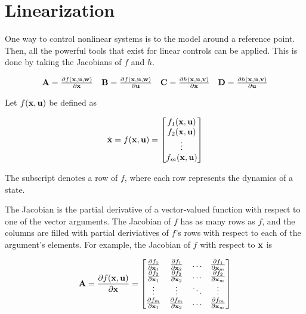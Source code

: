 \section{Linearization}

One way to control nonlinear \glspl{system} is to
 the \gls{model} around a reference point.
Then, all the powerful tools that exist for linear controls can be applied. This
is done by taking the Jacobians of $f$ and $h$.

\begin{align*}
  \begin{array}{cccc}
    \mathbf{A} = \frac{\partial f(\mathbf{x}, \mathbf{u}, \mathbf{w})}{\partial \mathbf{x}} &
    \mathbf{B} = \frac{\partial f(\mathbf{x}, \mathbf{u}, \mathbf{w})}{\partial \mathbf{u}} &
    \mathbf{C} = \frac{\partial h(\mathbf{x}, \mathbf{u}, \mathbf{v})}{\partial \mathbf{x}} &
    \mathbf{D} = \frac{\partial h(\mathbf{x}, \mathbf{u}, \mathbf{v})}{\partial \mathbf{u}}
  \end{array}
\end{align*}

Let $f(\mathbf{x}, \mathbf{u})$ be defined as

\begin{equation*}
  \dot{\mathbf{x}} = f(\mathbf{x}, \mathbf{u}) =
  \begin{bmatrix}
    f_1(\mathbf{x}, \mathbf{u}) \\
    f_2(\mathbf{x}, \mathbf{u}) \\
    \vdots \\
    f_m(\mathbf{x}, \mathbf{u})
  \end{bmatrix}
\end{equation*}

The subscript denotes a row of $f$, where each row represents the dynamics of a
state.

The Jacobian is the partial derivative of a vector-valued function with respect
to one of the vector arguments. The Jacobian of $f$ has as many rows as $f$, and
the columns are filled with partial deriviatives of $f$'s rows with respect to
each of the argument's elements. For example, the Jacobian of $f$ with respect
to $\mathbf{x}$ is

\begin{equation*}
  \mathbf{A} = \frac{\partial f(\mathbf{x}, \mathbf{u})}{\partial \mathbf{x}} =
  \begin{bmatrix}
    \frac{\partial f_1}{\partial \mathbf{x}_1} &
      \frac{\partial f_1}{\partial \mathbf{x}_2} & \hdots &
      \frac{\partial f_1}{\partial \mathbf{x}_m} \\
    \frac{\partial f_2}{\partial \mathbf{x}_1} &
      \frac{\partial f_2}{\partial \mathbf{x}_2} & \hdots &
      \frac{\partial f_2}{\partial \mathbf{x}_m} \\
    \vdots & \vdots & \ddots & \vdots \\
    \frac{\partial f_m}{\partial \mathbf{x}_1} &
      \frac{\partial f_m}{\partial \mathbf{x}_2} & \hdots &
      \frac{\partial f_m}{\partial \mathbf{x}_m}
  \end{bmatrix}
\end{equation*}

